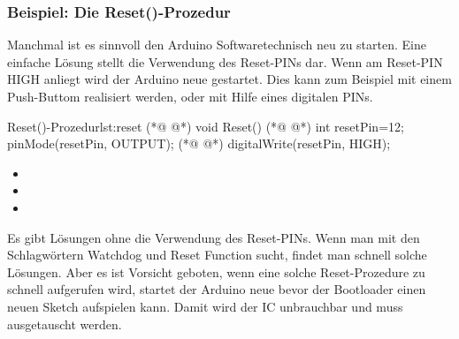 \subsubsection{Beispiel: Die Reset()-Prozedur}
Manchmal ist es sinnvoll den Arduino Softwaretechnisch neu zu starten. Eine einfache Lösung stellt die Verwendung des Reset-PINs dar. Wenn am Reset-PIN HIGH anliegt wird der Arduino neue gestartet. Dies kann zum Beispiel mit einem Push-Buttom realisiert werden, oder mit Hilfe eines digitalen PINs.


\begin{multicols}{2}
\null\vfill
\begin{arduinoCode}{Reset()-Prozedur}{lst:reset}
  (*@  @*)
void Reset() (*@  @*)
{      
  int resetPin=12;
  pinMode(resetPin, OUTPUT);     (*@  @*)  
  digitalWrite(resetPin, HIGH);    
}
\end{arduinoCode}

\vfill\null 
\columnbreak
\vfill\null 
\begin{itemize}
  \itemsep20pt
    \item[] 
    \item[] 
    \item[] 
 \end{itemize}
\vfill \null

\end{multicols}

Es gibt Lösungen ohne die Verwendung des Reset-PINs. Wenn man mit den Schlagwörtern Watchdog und Reset Function sucht, findet man schnell solche Lösungen. Aber es ist Vorsicht geboten, wenn eine solche Reset-Prozedure zu schnell aufgerufen wird, startet der Arduino neue bevor der Bootloader einen neuen Sketch aufspielen kann. Damit wird der IC unbrauchbar und muss ausgetauscht werden.    

\pagebreak
